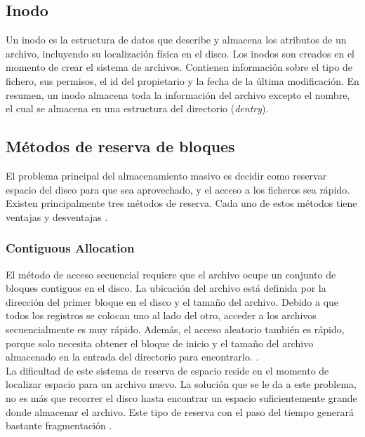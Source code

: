 \subsection{Inodo}
Un inodo es la estructura de datos que describe y almacena los atributos de un archivo, incluyendo su localización física en el disco. Los inodos son creados en el momento de crear el sistema de archivos. Contienen información sobre  el tipo de fichero, sus permisos, el id del propietario y la fecha de la última modificación. En resumen, un inodo almacena toda la información del archivo excepto el nombre, el cual se almacena en una estructura del directorio (\textit{dentry}).

\subsection{Métodos de reserva de bloques}
El problema principal del almacenamiento masivo es decidir como reservar espacio del disco para que sea aprovechado, y el acceso a los ficheros sea rápido. Existen principalmente tres métodos de reserva. Cada uno de estos métodos tiene ventajas y desventajas \cite{silberchatz}.


\subsubsection{Contiguous Allocation}
El método de acceso secuencial requiere que el archivo ocupe un conjunto de bloques contiguos en el disco. La ubicación del archivo está definida por la dirección del primer bloque en el disco y el tamaño del archivo. Debido a que todos los registros se colocan uno al lado del otro, acceder a los archivos secuencialmente es muy rápido. Además, el acceso aleatorio también es rápido, porque solo necesita obtener el bloque de inicio y el tamaño del archivo almacenado en la entrada del directorio para encontrarlo. \cite{silberchatz}.\\ 

\newpage
La dificultad de este sistema de reserva de espacio reside en el momento de localizar espacio para un archivo nuevo. La solución que se le da a este problema, no es más que recorrer el disco hasta encontrar un espacio suficientemente grande donde almacenar el archivo. Este tipo de reserva con el paso del tiempo generará bastante fragmentación \cite{silberchatz}.


